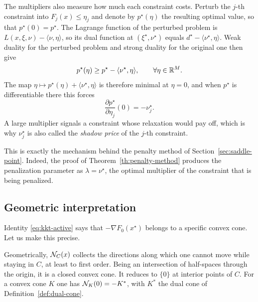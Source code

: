      The multipliers also measure how much each constraint costs. Perturb the $j$-th constraint into $F_j(x)\le \eta_j$ and denote by $p^\star(\eta)$ the resulting optimal value, so that $p^\star(0)=p^\star$. The Lagrange function of the perturbed problem is $L(x,\xi,\nu)-\langle \nu,\eta\rangle$, so its dual function at $(\xi^\star,\nu^\star)$ equals $d^\star - \langle\nu^\star,\eta\rangle$. Weak duality for the perturbed problem and strong duality for the original one then give
     \begin{equation}
         p^\star(\eta) \ge p^\star - \langle \nu^\star,\eta\rangle, \qquad \forall \eta \in \mathbb{R}^M.
     \end{equation}
     The map $\eta\mapsto p^\star(\eta)+\langle\nu^\star,\eta\rangle$ is therefore minimal at $\eta=0$, and when $p^\star$ is differentiable there this forces
     \begin{equation}
         \frac{\partial p^\star}{\partial \eta_j}(0) = -\nu_j^\star.
     \end{equation}
     A large multiplier signals a constraint whose relaxation would pay off, which is why $\nu_j^\star$ is also called the \emph{shadow price} of the $j$-th constraint.

     This is exactly the mechanism behind the penalty method of Section~\ref{sec:saddle-point}. Indeed, the proof of Theorem~\ref{th:penalty-method} produces the penalization parameter as $\lambda = \nu^\star$, the optimal multiplier of the constraint that is being penalized.

     \subsection{Geometric interpretation}
     \label{sec:kkt-geometry}

     Identity \eqref{eq:kkt-active} says that $-\nabla F_0(x^\star)$ belongs to a specific convex cone. Let us make this precise.


     Geometrically, $\mathcal{N}_C(x)$ collects the directions along which one cannot move while staying in $C$, at least to first order. Being an intersection of half-spaces through the origin, it is a closed convex cone. It reduces to $\{0\}$ at interior points of $C$. For a convex cone $K$ one has $\mathcal{N}_K(0)=-K^*$, with $K^*$ the dual cone of Definition~\ref{def:dual-cone}.

